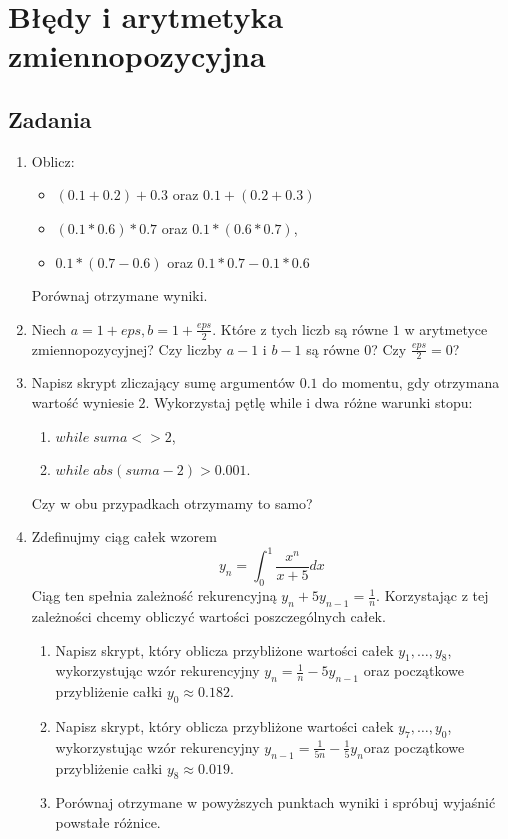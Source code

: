 \documentclass[10pt,a4paper]{article}
\begin{document}
\section*{Błędy i arytmetyka zmiennopozycyjna}

\subsection*{Zadania}
\begin{enumerate}


\item Oblicz:
\begin{itemize}
	\item $(0.1+0.2)+0.3$ oraz $0.1+(0.2+0.3)$
	\item $(0.1*0.6)*0.7$ oraz $0.1*(0.6*0.7)$,
	\item $0.1*(0.7-0.6)$ oraz $0.1*0.7-0.1*0.6$
\end{itemize}
Porównaj otrzymane wyniki.

\item Niech $a=1+eps,b=1+\frac{eps}{2}$. Które z tych liczb są równe $1$ w arytmetyce zmiennopozycyjnej? Czy liczby $a-1$ i $b-1$ są równe $0$? Czy $\frac{eps}{2}=0$?


\item Napisz skrypt zliczający sumę argumentów $0.1$ do momentu, gdy otrzymana wartość wyniesie $2$. Wykorzystaj pętlę while i dwa różne warunki stopu:
\begin{enumerate}
	\item $while \; suma<>2$,
	\item $ while \; abs(suma-2)>0.001$.
\end{enumerate}
Czy w obu przypadkach otrzymamy to samo?

\item Zdefinujmy ciąg całek wzorem 
$$y_n=\int^1_0 \frac{x^n}{x+5} dx$$
Ciąg ten spełnia zależność rekurencyjną $y_n+5y_{n-1}=\frac{1}{n}$. Korzystając z tej zależności chcemy obliczyć wartości poszczególnych całek.
\begin{enumerate}
	\item Napisz skrypt, który oblicza przybliżone wartości całek $y_1,\ldots,y_8$, wykorzystując wzór rekurencyjny $y_n=\frac{1}{n}-5y_{n-1}$ oraz początkowe przybliżenie całki $y_0\approx0.182$.
	\item Napisz skrypt, który oblicza przybliżone wartości całek $y_7,\ldots,y_0$, wykorzystując wzór rekurencyjny $y_{n-1}=\frac{1}{5n}-\frac{1}{5}y_n$oraz początkowe przybliżenie całki  $y_8\approx 0.019$.
	\item Porównaj otrzymane w powyższych punktach wyniki i spróbuj wyjaśnić powstałe różnice.
\end{enumerate}


\end{enumerate}
\end{document}

